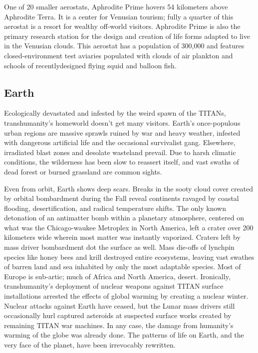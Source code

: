 One of 20 smaller aerostats, Aphrodite Prime hovers 54 kilometers above Aphrodite Terra. It is a center for Venusian tourism; fully a quarter of this aerostat is a resort for wealthy off-world visitors. Aphrodite Prime is also the primary research station for the design and creation of life forms adapted to live in the Venusian clouds. This aerostat has a population of 300,000 and features closed-environment test aviaries populated with clouds of air plankton and schools of recentlydesigned flying squid and balloon fish. 

\subsection{Earth} \label{sec:earth} 

Ecologically devastated and infested by the weird spawn of the TITANs, transhumanity's homeworld doesn't get many visitors. Earth's once-populous urban regions are massive sprawls ruined by war and heavy weather, infested with dangerous artificial life and the occasional survivalist gang. Elsewhere, irradiated blast zones and desolate wasteland prevail. Due to harsh climatic conditions, the wilderness has been slow to reassert itself, and vast swaths of dead forest or burned grassland are common sights. 

Even from orbit, Earth shows deep scars. Breaks in the sooty cloud cover created by orbital bombardment during the Fall reveal continents ravaged by coastal flooding, desertification, and radical temperature shifts. The only known detonation of an antimatter bomb within a planetary atmosphere, centered on what was the Chicago-waukee Metroplex in North America, left a crater over 200 kilometers wide wherein most matter was instantly vaporized. Craters left by mass driver bombardment dot the surface as well. Mass die-offs of lynchpin species like honey bees and krill destroyed entire ecosystems, leaving vast swathes of barren land and sea inhabited by only the most adaptable species. Most of Europe is sub-artic; much of Africa and North America, desert. Ironically, transhumanity's deployment of nuclear weapons against TITAN surface installations arrested the effects of global warming by creating a nuclear winter. Nuclear attacks against Earth have ceased, but the Lunar mass drivers still occasionally hurl captured asteroids at suspected surface works created by remaining TITAN war machines. In any case, the damage from humanity's warming of the globe was already done. The patterns of life on Earth, and the very face of the planet, have been irrevocably rewritten. 

